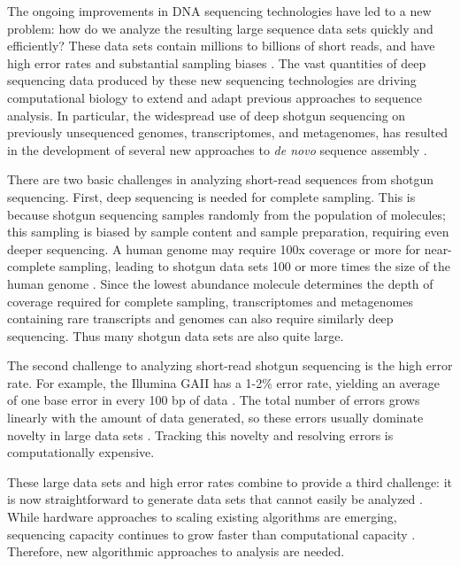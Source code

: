 \documentclass[10pt]{article}
\begin{document}
The ongoing improvements in DNA sequencing technologies have led to a new
problem: how do we analyze the resulting large sequence data sets
quickly and efficiently? These data sets contain millions to billions
of short reads, and have high error rates and substantial sampling
biases \cite{pubmed19997069}.  The vast quantities of deep sequencing data produced by
these new sequencing technologies are driving
computational biology to extend and adapt previous approaches to sequence
analysis.  In
particular, the widespread use of deep shotgun sequencing on
previously unsequenced genomes, transcriptomes, and metagenomes, has
resulted in the development of several new approaches to {\em de novo}
sequence assembly \cite{pubmed20211242}.

There are two basic challenges in analyzing short-read sequences from
shotgun sequencing. First, deep sequencing is needed for complete
sampling. This is because shotgun sequencing samples randomly from the
population of molecules; this sampling is biased by sample content and
sample preparation, requiring even deeper sequencing. A human genome
may require 100x coverage or more for near-complete sampling, leading
to shotgun data sets 100 or more times the size of the human genome
\cite{pubmed21187386}.  Since the lowest abundance molecule determines
the depth of coverage required for complete sampling, transcriptomes
and metagenomes containing rare transcripts and genomes can also
require similarly deep sequencing.  Thus many shotgun data sets are
also quite large.

The second challenge to analyzing short-read shotgun sequencing is the
high error rate.  For example, the Illumina GAII has a 1-2\% error
rate, yielding an average of one base error in every 100 bp of data
\cite{pubmed19997069}.  The total number of errors grows linearly with
the amount of data generated, so these errors usually dominate
novelty in large data sets \cite{pubmed21245053}.  Tracking this
novelty and resolving errors is computationally expensive.

These large data sets and high error rates combine to provide a third
challenge: it is now straightforward to generate data sets that cannot
easily be analyzed \cite{pubmed21867570}.  While hardware approaches
to scaling existing algorithms are emerging, sequencing capacity
continues to grow faster than computational capacity
\cite{pubmed20441614}.  Therefore, new algorithmic approaches to
analysis are needed.
\end{document}
